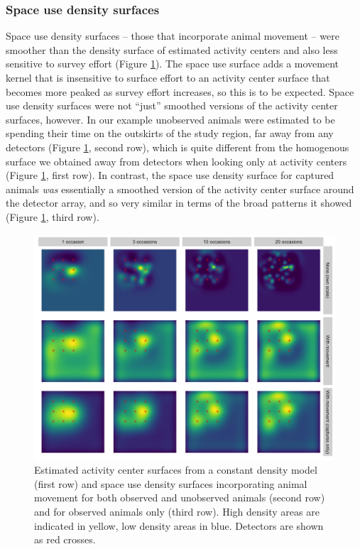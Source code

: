 \documentclass[a4paper,12pt]{article}
\begin{document}
\subsubsection{Space use density surfaces}

Space use density surfaces -- those that incorporate animal movement -- were smoother than the density surface of estimated activity centers and also less sensitive to survey effort (Figure \ref{move}). The space use surface adds a movement kernel that is insensitive to surface effort to an activity center surface that becomes more peaked as survey effort increases, so this is to be expected. Space use density surfaces were not ``just'' smoothed versions of the activity center surfaces, however. In our example unobserved animals were estimated to be spending their time on the outskirts of the study region, far away from any detectors (Figure \ref{move}, second row), which is quite different from the homogenous surface we obtained away from detectors when looking only at activity centers (Figure \ref{move}, first row). In contrast, the space use density surface for captured animals {\it was} essentially a smoothed version of the activity center surface around the detector array, and so very similar in terms of the broad patterns it showed (Figure \ref{move}, third row).

\begin{figure}[htbp]
\centering
\includegraphics[width=1\textwidth]{mona_with_movement.png}
\caption{Estimated activity center surfaces from a constant density model (first row) and space use density surfaces incorporating animal movement for both observed and unobserved animals (second row) and for observed animals only (third row). High density areas are indicated in yellow, low density areas in blue. Detectors are shown as red crosses.}
\label{move}
\end{figure}
\end{document}
